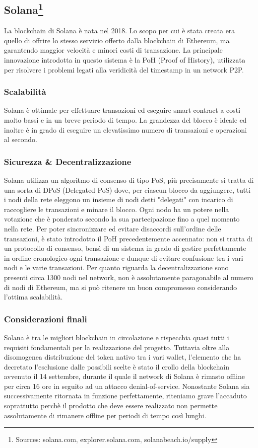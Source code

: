 \documentclass[a4paper, 12pt]{article}
\begin{document}
\newpage
\subsection*{Solana\footnote{Sources: solana.com, explorer.solana.com, solanabeach.io/supply}}
La blockchain di Solana è nata nel 2018. Lo scopo per cui è stata creata era quello di offrire lo stesso servizio offerto dalla blockchain di Ethereum, ma garantendo maggior velocità e minori costi di transazione. La principale innovazione introdotta in questo sistema è la PoH (Proof of History), utilizzata per risolvere i problemi legati alla veridicità del timestamp in un network P2P.
\subsubsection*{Scalabilità}
Solana è ottimale per effettuare transazioni ed eseguire smart contract a costi molto bassi e in un breve periodo di tempo. La grandezza del blocco è ideale ed inoltre è in grado di eseguire un elevatissimo numero di transazioni e operazioni al secondo.
\subsubsection*{Sicurezza \& Decentralizzazione}
Solana utilizza un algoritmo di consenso di tipo PoS, più precisamente si tratta di una sorta di DPoS (Delegated PoS) dove, per ciascun blocco da aggiungere, tutti i nodi della rete eleggono un insieme di nodi detti "delegati" con incarico di raccogliere le transazioni e minare il blocco. Ogni nodo ha un potere nella votazione che è ponderato secondo la sua partecipazione fino a quel momento nella rete. Per poter sincronizzare ed evitare disaccordi sull'ordine delle transazioni, è stato introdotto il PoH precedentemente accennato: non si tratta di un protocollo di consenso, bensì di un sistema in grado di gestire perfettamente in ordine cronologico ogni transazione e dunque di evitare confusione tra i vari nodi e le varie transazioni. Per quanto riguarda la decentralizzazione sono presenti circa 1300 nodi nel network, non è assolutamente paragonabile al numero di nodi di Ethereum, ma si può ritenere un buon compromesso considerando l'ottima scalabilità.
\subsubsection*{Considerazioni finali}
Solana è tra le migliori blockchain in circolazione e rispecchia quasi tutti i requisiti fondamentali per la realizzazione del progetto. Tuttavia oltre alla disomogenea distribuzione del token nativo tra i vari wallet, l'elemento che ha decretato l'esclusione dalle possibili scelte è stato il crollo della blockchain avvenuto il 14 settembre, durante il quale il network di Solana è rimasto offline per circa 16 ore in seguito ad un attacco denial-of-service. Nonostante Solana sia successivamente ritornata in funzione perfettamente, riteniamo grave l'accaduto soprattutto perchè il prodotto che deve essere realizzato non permette assolutamente di rimanere offline per periodi di tempo così lunghi.
\newpage
\end{document}
